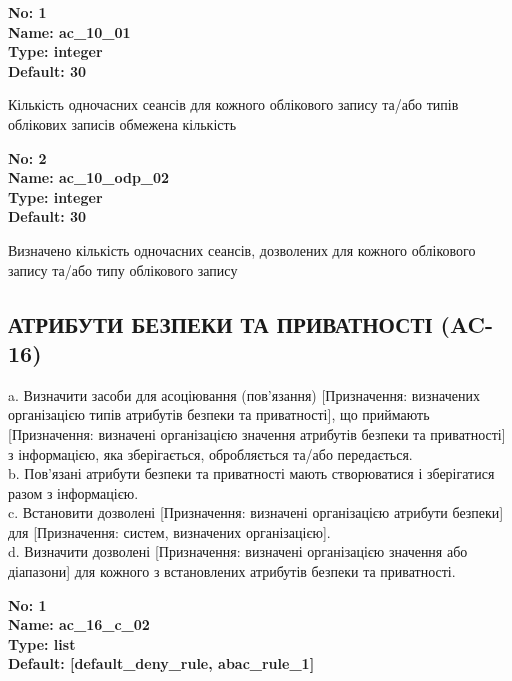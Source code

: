 \documentclass{article}
\begin{document}
\vspace{10pt}
{\footnotesize\bfseries
No: 1\\
Name: ac\_\allowbreak{}10\_\allowbreak{}01\\
Type: integer\\
Default: 30
}

{\footnotesize Кількість одночасних сеансів для кожного облікового запису та/або типів облікових записів обмежена кількість}


{\footnotesize\bfseries
No: 2\\
Name: ac\_\allowbreak{}10\_\allowbreak{}odp\_\allowbreak{}02\\
Type: integer\\
Default: 30
}

{\footnotesize Визначено кількість одночасних сеансів, дозволених для кожного облікового запису та/або типу облікового запису}




\subsection{АТРИБУТИ БЕЗПЕКИ ТА ПРИВАТНОСТІ (AC-16)}
a. Визначити засоби для асоціювання (пов'язання) [Призначення: визначених організацією типів атрибутів безпеки та приватності], що приймають [Призначення: визначені організацією значення атрибутів безпеки та приватності] з інформацією, яка зберігається, обробляється та/або передається.\\ 
b. Пов'язані атрибути безпеки та приватності мають створюватися і зберігатися разом з інформацією.\\ 
c. Встановити дозволені [Призначення: визначені організацією атрибути безпеки] для [Призначення: систем, визначених організацією].\\ 
d. Визначити дозволені [Призначення: визначені організацією значення або діапазони] для кожного з встановлених атрибутів безпеки та приватності.

\vspace{10pt}
{\footnotesize\bfseries
No: 1\\
Name: ac\_\allowbreak{}16\_\allowbreak{}c\_\allowbreak{}02\\
Type: list\\
Default: [\textquotedbl{}default\_\allowbreak{}deny\_\allowbreak{}rule\textquotedbl{}, \textquotedbl{}abac\_\allowbreak{}rule\_\allowbreak{}1\textquotedbl{}]
}
\end{document}
